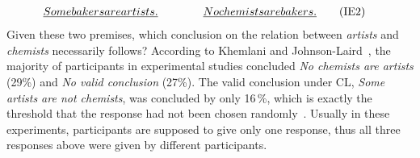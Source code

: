 \documentclass[12pt]{article}
\begin{document}
\begin{align}
 \emph{Some bakers are artists. }\quad\quad  \quad\quad & \emph{No chemists are bakers.} \tag{IE2} 
\end{align}
Given these
two premises, which conclusion on the relation between \emph{artists} and \emph{chemists} necessarily follows?
According to Khemlani and Johnson-Laird~\cite{khemlani:2012}, the majority of participants in experimental studies
concluded \emph{No chemists are artists} (29\;\%) and \emph{No valid conclusion} (27\;\%).
The valid conclusion under CL, \emph{Some artists are not chemists},
was concluded by only 16\,\%, which is exactly the threshold that the response had not been chosen randomly~\cite{khemlani:2012}.
Usually in these experiments, participants are supposed to give only one response, thus all three responses above
were given by different participants. 
\end{document}
